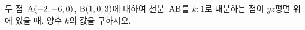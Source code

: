 두 점~$\mathrm{A}(-2{,}\mkern3mu\mathopen{}-6{,}\mkern3mu\mathopen{}0)$, $\mathrm{B}(1{,}\mkern3mu\mathopen{}0{,}\mkern3mu\mathopen{}3)$에 대하여 선분~$\mathrm{AB}$를 $k:1$로 내분하는 점이 $yz$평면 위에 있을 때, 양수 $k$의 값을 구하시오.
